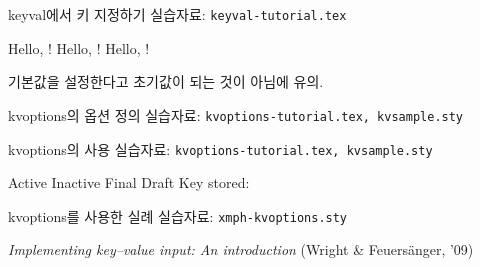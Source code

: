 \documentclass[compress]{beamer}
\newcommand\seefile[1]{%
  {\tiny 실습자료: \texttt{#1}}%
}
\begin{document}
\begin{frame}[fragile=singleslide]{keyval에서 키 지정하기}
  \seefile{keyval-tutorial.tex}
  \begin{latexcode}
    \newcommand{\hello}{Hello, \fam@name!}
    \hello
    \hello
    \hello
  \end{latexcode}
  기본값을 설정한다고 초기값이 되는 것이 아님에 유의.
\end{frame}

\begin{frame}[fragile=singleslide]{kvoptions의 옵션 정의}
  \seefile{kvoptions-tutorial.tex, kvsample.sty}
  \begin{latexcode}
    \usepackage[draft=false,active,key={val 1}]{kvsample}
  \end{latexcode}
\end{frame}

\begin{frame}[fragile=singleslide]{kvoptions의 사용}
  \seefile{kvoptions-tutorial.tex, kvsample.sty}
  \begin{latexcode}
    \ifkvsample@active
      {Active}
    \else
      {Inactive}
    \fi
    \ifkvsample@final
      {Final}
    \else
      {Draft}
    \fi
    Key stored: \kvsample@key
  \end{latexcode}
\end{frame}

\begin{frame}[fragile=singleslide]{kvoptions를 사용한 실례}
  \seefile{xmph-kvoptions.sty}

  \textit{Implementing key--value input: An introduction} (Wright \& Feuers\"anger, '09)
  \begin{latexcode}
    \usepackage[
      active,
      usebold,
      usecolor,
      color=blue,
    ]{xmph}
  \end{latexcode}
  \begin{center}
  \end{center}
\end{frame}
\end{document}
